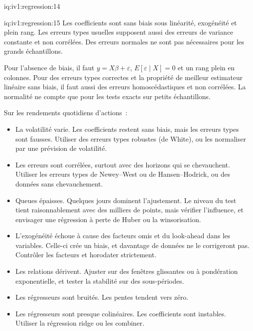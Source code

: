 \begin{solution}{iq:iv1:regression:14}
\end{solution}

\enlargethispage{-3\baselineskip}%
\begin{solution}{iq:iv1:regression:15}
Les coefficients sont sans biais sous linéarité, exogénéité et plein rang. Les erreurs types usuelles supposent aussi des erreurs de variance constante et non corrélées. Des erreurs normales ne sont pas nécessaires pour les grands échantillons.

Pour l'absence de biais, il faut $y = X\beta + \varepsilon$, $E[\varepsilon \mid X] = 0$ et un rang plein en colonnes. Pour des erreurs types correctes et la propriété de meilleur estimateur linéaire sans biais, il faut aussi des erreurs homoscédastiques et non corrélées. La normalité ne compte que pour les tests exacts sur petits échantillons.

Sur les rendements quotidiens d'actions~:
\begin{itemize}[leftmargin=*,itemsep=1pt,topsep=2pt]
\item La volatilité varie. Les coefficients restent sans biais, mais les erreurs types sont fausses. Utiliser des erreurs types robustes (de White), ou les normaliser par une prévision de volatilité.
\item Les erreurs sont corrélées, surtout avec des horizons qui se chevauchent. Utiliser les erreurs types de Newey--West ou de Hansen--Hodrick, ou des données sans chevauchement.
\item Queues épaisses. Quelques jours dominent l'ajustement. Le niveau du test tient raisonnablement avec des milliers de points, mais vérifier l'influence, et envisager une régression à perte de Huber ou la winsorisation.
\item L'exogénéité échoue à cause des facteurs omis et du look-ahead dans les variables. Celle-ci crée un biais, et davantage de données ne le corrigeront pas. Contrôler les facteurs et horodater strictement.
\item Les relations dérivent. Ajuster sur des fenêtres glissantes ou à pondération exponentielle, et tester la stabilité sur des sous-périodes.
\item Les régresseurs sont bruités. Les pentes tendent vers zéro.
\item Les régresseurs sont presque colinéaires. Les coefficients sont instables. Utiliser la régression ridge ou les combiner.
\end{itemize}

\end{solution}

